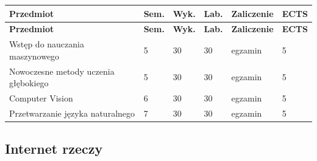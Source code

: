 \documentclass[12pt,a4paper]{article}
\newcommand{\thdrule}{\noalign{\global\setlength{\extrarowheight}{0pt}}}
\newcommand{\thdend}{\noalign{\global\setlength{\extrarowheight}{4pt}}}
\begin{document}
{\scriptsize
\begin{longtable}{m{6.5cm}m{0.7cm}m{1cm}m{1cm}m{1.7cm}m{0.7cm}}
\thdrule\toprule
\rowcolor{pjatkRed}
{\color{white}\footnotesize\textbf{\vphantom{Ag}Przedmiot}} & {\color{white}\footnotesize\textbf{\vphantom{Ag}Sem.}} & {\color{white}\footnotesize\textbf{\vphantom{Ag}Wyk.}} & {\color{white}\footnotesize\textbf{\vphantom{Ag}Lab.}} & {\color{white}\footnotesize\textbf{\vphantom{Ag}Zaliczenie}} & {\color{white}\footnotesize\textbf{\vphantom{Ag}ECTS}} \\
\midrule\thdend
\endfirsthead
\thdrule\toprule
\rowcolor{pjatkRed}
{\color{white}\footnotesize\textbf{\vphantom{Ag}Przedmiot}} & {\color{white}\footnotesize\textbf{\vphantom{Ag}Sem.}} & {\color{white}\footnotesize\textbf{\vphantom{Ag}Wyk.}} & {\color{white}\footnotesize\textbf{\vphantom{Ag}Lab.}} & {\color{white}\footnotesize\textbf{\vphantom{Ag}Zaliczenie}} & {\color{white}\footnotesize\textbf{\vphantom{Ag}ECTS}} \\
\midrule\thdend
\endhead
\rowcolor{tableRowLight} Wstęp do nauczania maszynowego & 5 & 30 & 30 & {\scriptsize egzamin} & 5 \\
\rowcolor{tableRowAlt} Nowoczesne metody uczenia głębokiego & 5 & 30 & 30 & {\scriptsize egzamin} & 5 \\
\rowcolor{tableRowLight} Computer Vision & 6 & 30 & 30 & {\scriptsize egzamin} & 5 \\
\rowcolor{tableRowAlt} Przetwarzanie języka naturalnego & 7 & 30 & 30 & {\scriptsize egzamin} & 5 \\
\bottomrule
\end{longtable}}

\subsection*{Internet rzeczy}
\end{document}
